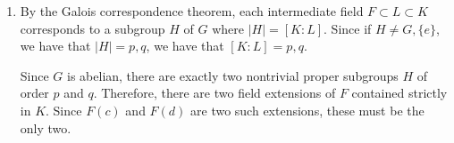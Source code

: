 \documentclass[12pt]{Qual}
\begin{document}
\begin{solution}
\begin{enumerate}[label=(\alph*)]
\begin{comment}
    Also

    Thus, in this case, $n_p=n_q=1$ so $$G\cong \mathbb{Z}_{pq}.$$


    If $p|(q-1)$, and $n_p=q-1$, then because $n_q=1$, by the recognizing semi-direct products theorem, we have that $G\cong \mathbb{Z}_q\rtimes_\varphi\mathbb{Z}_p$ for some $\varphi.$

    Let $\varphi:\mathbb{Z}_p\to\aut(\mathbb{Z}_q)\cong\mathbb{Z}_{q-1}.$

    Then if $\mathbb{Z}_p=\langle x\rangle$, and $\mathbb{Z}_q=\langle y\rangle$, then let $y\mapsto y^t$ be a non-trivial element of $\aut(\mathbb{Z}_q)$ of order $p$ (which exists since $p|(q-1)$. Then $\varphi$ defines multiplication by $xyx^{-1}=\varphi(x)(y)=y^t$. This gives the semi-direct product structure of $G$ as $$G\cong\langle x,y\,|\,x^p=y^q=1,xyx^{-1}=y^t\rangle.$$

    Furthermore, since for any other map $\sigma\in\aut(\mathbb{Z}_q)$ with $\sigma(y)=y^s$ having order $p$ there exists some map $\tau\in\aut(\mathbb{Z}_q)$ such that $\tau\sigma\tau^{-1}(y)=y^t$. Namely, all other possible structures for $G$ as a semi-direct prduct will be isomorphic.
\end{comment}

    \item By the Galois correspondence theorem, each intermediate field $F\subset L\subset K$ corresponds to a subgroup $H$ of $G$ where $|H|=[K:L].$ Since if $H\not=G,\{e\}$, we have that $|H|=p,q$, we have that $[K:L]=p,q.$

    Since $G$ is abelian, there are exactly two nontrivial proper subgroups $H$ of order $p$ and $q.$ Therefore, there are two field extensions of $F$ contained strictly in $K$. Since $F(c)$ and $F(d)$ are two such extensions, these must be the only two.
\end{enumerate}
\end{solution}
\newpage
\end{document}
